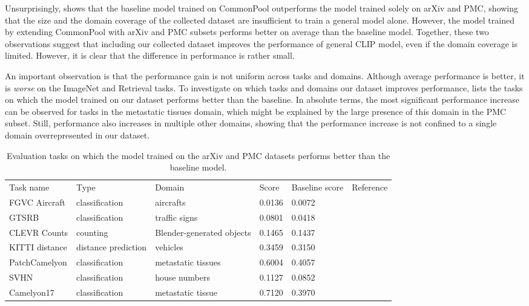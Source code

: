 Unsurprisingly,  shows that the baseline model trained on CommonPool outperforms the model trained solely on arXiv and PMC, showing that the size and the domain coverage of the collected dataset are insufficient to train a general model alone. However, the model trained by extending CommonPool with arXiv and PMC subsets performs better on average than the baseline model. Together, these two observations suggest that including our collected dataset improves the performance of general CLIP model, even if the domain coverage is limited. However, it is clear that the difference in performance is rather small.

An important observation is that the performance gain is not uniform across tasks and domains. Although average performance is better, it is \emph{worse} on the ImageNet and Retrieval tasks. To investigate on which tasks and domains our dataset improves performance,  lists the tasks on which the model trained on our dataset performs better than the baseline. In absolute terms, the most significant performance increase can be observed for tasks in the metastatic tissues domain, which might be explained by the large presence of this domain in the PMC subset. Still, performance also increases in multiple other domains, showing that the performance increase is not confined to a single domain overrepresented in our dataset.

\begin{table*}
	\begin{tabular}{lllllr}
		Task name & Type & Domain & Score & Baseline score & Reference \\
		FGVC Aircraft & classification & aircrafts & 0.0136 & 0.0072 & \cite{DBLP:journals/corr/MajiRKBV13} \\
		GTSRB & classification & traffic signs & 0.0801 & 0.0418 & \cite{Houben-IJCNN-2013} \\
		CLEVR Counts & counting & Blender-generated objects & 0.1465 & 0.1437 & \cite{DBLP:conf/cvpr/JohnsonHMFZG17} \\
		KITTI distance & distance prediction & vehicles & 0.3459 & 0.3150 & \cite{DBLP:conf/cvpr/GeigerLU12} \\
		PatchCamelyon & classification & metastatic tissues & 0.6004 & 0.4057 & \cite{DBLP:conf/miccai/VeelingLWCW18} \\
		SVHN & classification & house numbers & 0.1127 & 0.0852 & \cite{svhn} \\
		Camelyon17 & classification & metastatic tissue & 0.7120 & 0.3970 & \cite{DBLP:journals/tmi/BandiGMDBHBLPZL19} \\
	\end{tabular}
	\caption{Evaluation tasks on which the model trained on the arXiv and PMC datasets performs better than the baseline model.}
	\label{tab:tasks}
\end{table*}

